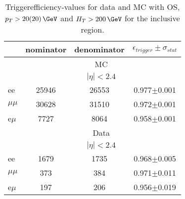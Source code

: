 
\begin{table}[hbp] \caption{Triggerefficiency-values for data and MC with OS, $p_T>20(20)\,\GeV$ and $H_T>200\,\GeV$ for the inclusive region.} 
\centering 
\renewcommand{\arraystretch}{1.2} 
\begin{tabular}{|l|c|c|c|}     
\hline    
 & nominator & denominator & $\epsilon_{trigger} \pm \sigma_{stat}$ \\    
\hline\hline
& \multicolumn{3}{|c|}{MC} \\
\hline
& \multicolumn{3}{|c|}{$|\eta|<2.4$ } \\
\hline 
ee & 25946 & 26553 & 0.977$\pm$0.001 \\
$\mu\mu$ & 30628 & 31510 & 0.972$\pm$0.001 \\
e$\mu$ & 7727 & 8064 & 0.958$\pm$0.001 \\
    
    \hline 
&\multicolumn{3}{|c|}{Data} \\
\hline
& \multicolumn{3}{|c|}{$|\eta|<2.4$ } \\
\hline
ee & 1679 & 1735 & 0.968$\pm$0.005 \\
$\mu\mu$ & 373 & 384 & 0.971$\pm$0.011 \\
e$\mu$ & 197 & 206 & 0.956$\pm$0.019 \\
 
 \hline     
\end{tabular}  
\label{tab:EffValues_Inclusive}
\end{table}
